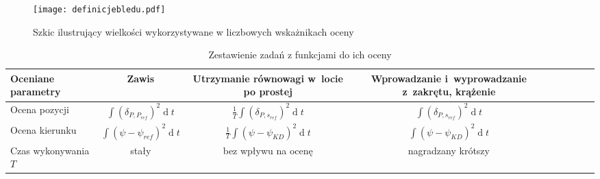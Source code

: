 \begin{figure}[!h]
    \centering \texttt{[image: definicjebledu.pdf]}
    \caption{Szkic ilustrujący wielkości wykorzystywane w liczbowych wskażnikach oceny}
    \label{fig:definicjebledu}
\end{figure}

\begin{table}[!h] \centering
    \caption{Zestawienie zadań z funkcjami do ich oceny}
    \label{tab:ocena-funkcje}
    \renewcommand{\arraystretch}{1.3} %

    \begin{tabular}{| l *{8}{| c} |}
    \hline
    \textbf{Oceniane parametry} &
    Zawis &
    \parbox{10em}{\raggedright Utrzymanie równowagi w~locie po prostej} &
    \parbox{10em}{\raggedright Wprowadzanie i~wyprowadzanie z~zakrętu, krążenie} \\ \hline \hline
    Ocena pozycji & $ \int{(\delta_{P,P_{ref}})^2 \operatorname{d}t} $ & $ \frac{1}{T} \int{(\delta_{P,s_{ref}})^2 \operatorname{d}t} $ & $ \int{(\delta_{P,s_{ref}})^2 \operatorname{d}t} $ \\ \hline
    Ocena kierunku & $ \int{(\psi - \psi_{ref})^2 \operatorname{d}t} $ & $ \frac{1}{T} \int{(\psi - \psi_{KD})^2 \operatorname{d}t} $ & $ \int{(\psi - \psi_{KD})^2 \operatorname{d}t} $ \\ \hline
    Czas wykonywania $ T $ & stały & bez wpływu na ocenę & nagradzany krótszy \\ \hline
  \end{tabular}
\end{table}

